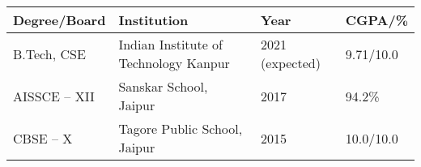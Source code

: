 
\newcommand{\education}[4]{
  \normalsize{#1} & \normalsize{#2} & \normalsize{#3} & \normalsize{#4}
}
\begin{center}
\begin{tabular}{ | >{\centering\arraybackslash}m{4.5cm}| >{\centering\arraybackslash}m{7.5cm} | >{\centering\arraybackslash}m{2.5cm} | >{\centering\arraybackslash}m{2.5cm} | }
  \hline
  \education{\textbf{Degree/Board}}{\textbf{Institution}}{\textbf{Year}}{\textbf{CGPA/\%}}\\
  \hline
  \education{B.Tech, CSE}{Indian Institute of Technology Kanpur}{2021 (expected)}{9.71/10.0}\\
  \education{AISSCE -- XII}{Sanskar School, Jaipur}{2017}{94.2\%}\\
  \education{CBSE -- X}{Tagore Public School, Jaipur}{2015}{10.0/10.0}\\
  \hline
\end{tabular}
\end{center}
\vspace{-3.9mm}

